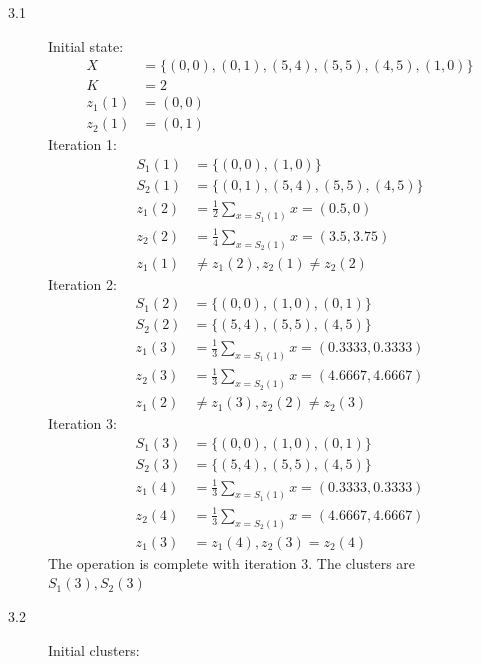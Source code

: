 \documentclass[fleqn]{article}
\begin{document}
\begin{description}
\item [3.1]
    Initial state:
    \begin{align*}
        X &= \{ (0,0), (0,1), (5,4), (5,5), (4,5), (1,0) \} \\
        K &= 2 \\
        z_1(1) &= (0,0) \\
        z_2(1) &= (0,1)
    \end{align*}
    Iteration 1:
    \begin{align*}
        S_1(1) &= \{ (0,0), (1,0) \} \\
        S_2(1) &= \{ (0,1), (5,4), (5,5), (4,5) \} \\
        z_1(2) &= \frac{1}{2} \sum_{x=S_1(1)}{x} = (0.5, 0) \\
        z_2(2) &= \frac{1}{4} \sum_{x=S_2(1)}{x} = (3.5, 3.75) \\
        z_1(1) &\neq z_1(2), z_2(1) \neq z_2(2)
    \end{align*}
    Iteration 2:
    \begin{align*}
        S_1(2) &= \{ (0,0), (1,0), (0,1) \} \\
        S_2(2) &= \{ (5,4), (5,5), (4,5) \} \\
        z_1(3) &= \frac{1}{3} \sum_{x=S_1(1)}{x} = (0.3333, 0.3333) \\
        z_2(3) &= \frac{1}{3} \sum_{x=S_2(1)}{x} = (4.6667, 4.6667) \\
        z_1(2) &\neq z_1(3), z_2(2) \neq z_2(3)
    \end{align*}
    Iteration 3:
    \begin{align*}
        S_1(3) &= \{ (0,0), (1,0), (0,1) \} \\
        S_2(3) &= \{ (5,4), (5,5), (4,5) \} \\
        z_1(4) &= \frac{1}{3} \sum_{x=S_1(1)}{x} = (0.3333, 0.3333) \\
        z_2(4) &= \frac{1}{3} \sum_{x=S_2(1)}{x} = (4.6667, 4.6667) \\
        z_1(3) &= z_1(4), z_2(3) = z_2(4)
    \end{align*}
    The operation is complete with iteration 3. The clusters are
    \begin{math}S_1(3), S_2(3)\end{math}

\item [3.2]
    Initial clusters:


\end{description}
\end{document}
